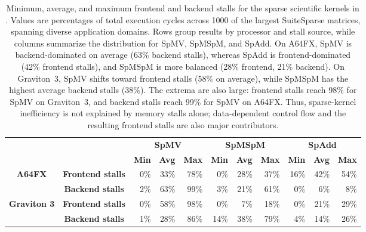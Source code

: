 \begin{table}[htbp!]
\centering
\footnotesize
\caption[Summary of CPU stalls on sparse scientific kernels.]
{Minimum, average, and maximum frontend and backend stalls for the sparse scientific kernels in . Values are percentages of total execution cycles across 1000 of the largest SuiteSparse matrices, spanning diverse application domains. Rows group results by processor and stall source, while columns summarize the distribution for SpMV, SpMSpM, and SpAdd. On A64FX, SpMV is backend-dominated on average (63\% backend stalls), whereas SpAdd is frontend-dominated (42\% frontend stalls), and SpMSpM is more balanced (28\% frontend, 21\% backend). On Graviton~3, SpMV shifts toward frontend stalls (58\% on average), while SpMSpM has the highest average backend stalls (38\%). The extrema are also large: frontend stalls reach 98\% for SpMV on Graviton~3, and backend stalls reach 99\% for SpMV on A64FX. Thus, sparse-kernel inefficiency is not explained by memory stalls alone; data-dependent control flow and the resulting frontend stalls are also major contributors.}
\label{tab:implications-scientific-stall-summary}

\begin{tabular}{cc|rrr|rrr|rrr}
\toprule
& &
\multicolumn{3}{c|}{\textbf{SpMV}} &
\multicolumn{3}{c|}{\textbf{SpMSpM}} &
\multicolumn{3}{c}{\textbf{SpAdd}} \\
& &
\textbf{Min} & \textbf{Avg} & \textbf{Max} &
\textbf{Min} & \textbf{Avg} & \textbf{Max} &
\textbf{Min} & \textbf{Avg} & \textbf{Max} \\
\midrule

\multirow{2}{*}{\textbf{A64FX}}
& \textbf{Frontend stalls}
& 0\% & 33\% & 78\%
& 0\% & 28\% & 37\%
& 16\% & 42\% & 54\% \\

& \textbf{Backend stalls}
& 2\% & 63\% & 99\%
& 3\% & 21\% & 61\%
& 0\% & 6\% & 8\% \\

\midrule

\multirow{2}{*}{\textbf{Graviton 3}}
& \textbf{Frontend stalls}
& 0\% & 58\% & 98\%
& 0\% & 7\% & 18\%
& 0\% & 21\% & 29\% \\

& \textbf{Backend stalls}
& 1\% & 28\% & 86\%
& 14\% & 38\% & 79\%
& 4\% & 14\% & 26\% \\

\bottomrule
\end{tabular}
\end{table}

